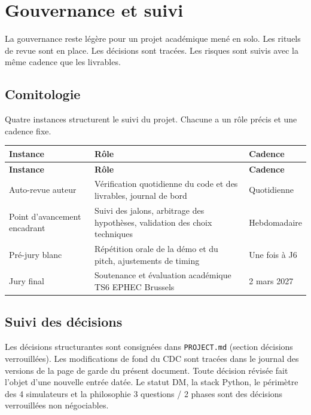 \chapter{Gouvernance et suivi}
\label{ch:gouvernance}

La gouvernance reste légère pour un projet académique mené en solo. Les rituels de revue sont en place. Les décisions sont tracées. Les risques sont suivis avec la même cadence que les livrables.

\section{Comitologie}
\label{sec:comitologie}

Quatre instances structurent le suivi du projet. Chacune a un rôle précis et une cadence fixe.

\bridgezebra
\begin{longtable}{p{4.5cm}p{7cm}p{3cm}}
  \toprule
  \rowcolor{bridgeblue!90}
  {\color{white}\bfseries Instance} & {\color{white}\bfseries Rôle} & {\color{white}\bfseries Cadence} \\
  \midrule
  \endfirsthead
  \toprule
  \rowcolor{bridgeblue!90}
  {\color{white}\bfseries Instance} & {\color{white}\bfseries Rôle} & {\color{white}\bfseries Cadence} \\
  \midrule
  \endhead
  \bottomrule
  \endfoot
  Auto-revue auteur & Vérification quotidienne du code et des livrables, journal de bord & Quotidienne \\
  Point d'avancement encadrant & Suivi des jalons, arbitrage des hypothèses, validation des choix techniques & Hebdomadaire \\
  Pré-jury blanc & Répétition orale de la démo et du pitch, ajustements de timing & Une fois à J6 \\
  Jury final & Soutenance et évaluation académique TS6 EPHEC Brussels & 2 mars 2027 \\
\end{longtable}

\section{Suivi des décisions}
\label{sec:suivi-decisions}

Les décisions structurantes sont consignées dans \texttt{PROJECT.md} (section décisions verrouillées). Les modifications de fond du CDC sont tracées dans le journal des versions de la page de garde du présent document. Toute décision révisée fait l'objet d'une nouvelle entrée datée. Le statut DM, la stack Python, le périmètre des 4 simulateurs et la philosophie 3 questions / 2 phases sont des décisions verrouillées non négociables.


